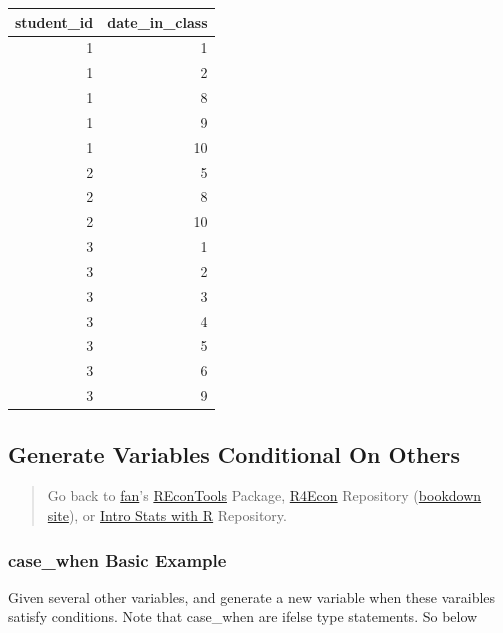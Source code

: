 \documentclass[
]{book}
\begin{document}
\begin{table}[!h]
\centering
\begin{tabular}{r|r}
\hline
student\_id & date\_in\_class\\
\hline
\rowcolor{gray!6}  1 & 1\\
\hline
1 & 2\\
\hline
\rowcolor{gray!6}  1 & 8\\
\hline
1 & 9\\
\hline
\rowcolor{gray!6}  1 & 10\\
\hline
2 & 5\\
\hline
\rowcolor{gray!6}  2 & 8\\
\hline
2 & 10\\
\hline
\rowcolor{gray!6}  3 & 1\\
\hline
3 & 2\\
\hline
\rowcolor{gray!6}  3 & 3\\
\hline
3 & 4\\
\hline
\rowcolor{gray!6}  3 & 5\\
\hline
3 & 6\\
\hline
\rowcolor{gray!6}  3 & 9\\
\hline
\end{tabular}
\end{table}

\hypertarget{generate-variables-conditional-on-others}{%
\subsection{Generate Variables Conditional On Others}\label{generate-variables-conditional-on-others}}

\begin{quote}
Go back to \href{http://fanwangecon.github.io/}{fan}'s \href{https://fanwangecon.github.io/REconTools/}{REconTools} Package, \href{https://fanwangecon.github.io/R4Econ/}{R4Econ} Repository (\href{https://fanwangecon.github.io/R4Econ/bookdown}{bookdown site}), or \href{https://fanwangecon.github.io/Stat4Econ/}{Intro Stats with R} Repository.
\end{quote}

\hypertarget{case_when-basic-example}{%
\subsubsection{case\_when Basic Example}\label{case_when-basic-example}}

Given several other variables, and generate a new variable when these varaibles satisfy conditions. Note that case\_when are ifelse type statements. So below
\end{document}
